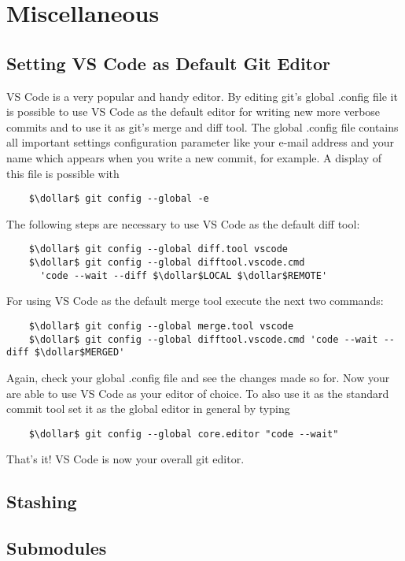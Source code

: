 \chapter{Miscellaneous}
\label{chapter:Miscellaneous}

\section{Setting VS Code as Default Git Editor}
\label{chapter:Miscellaneous.1}

VS Code is a very popular and handy editor. By editing git's global .config file it is possible to use VS Code as the default editor for writing 
new more verbose commits and to use it as git's merge and diff tool. The global .config file contains all important settings configuration parameter
like your e-mail address and your name which appears when you write a new commit, for example.
A display of this file is possible with
\begin{lstlisting}
	$\dollar$ git config --global -e
\end{lstlisting} 
The following steps are necessary to use VS Code as the default diff tool:
\begin{lstlisting}
	$\dollar$ git config --global diff.tool vscode
	$\dollar$ git config --global difftool.vscode.cmd 
	  'code --wait --diff $\dollar$LOCAL $\dollar$REMOTE'
\end{lstlisting}
For using VS Code as the default merge tool execute the next two commands:
\begin{lstlisting}
	$\dollar$ git config --global merge.tool vscode
	$\dollar$ git config --global difftool.vscode.cmd 'code --wait --diff $\dollar$MERGED'
\end{lstlisting}
Again, check your global .config file and see the changes made so for. Now your are able to use 
VS Code as your editor of choice. To also use it as the standard commit tool set it as the global editor in general by typing 
\begin{lstlisting}
	$\dollar$ git config --global core.editor "code --wait"
\end{lstlisting}
That's it! VS Code is now your overall git editor.


\section{Stashing}
\label{chapter:Miscellaneous.2}


\section{Submodules}
\label{chapter:Miscellaneous.3}

